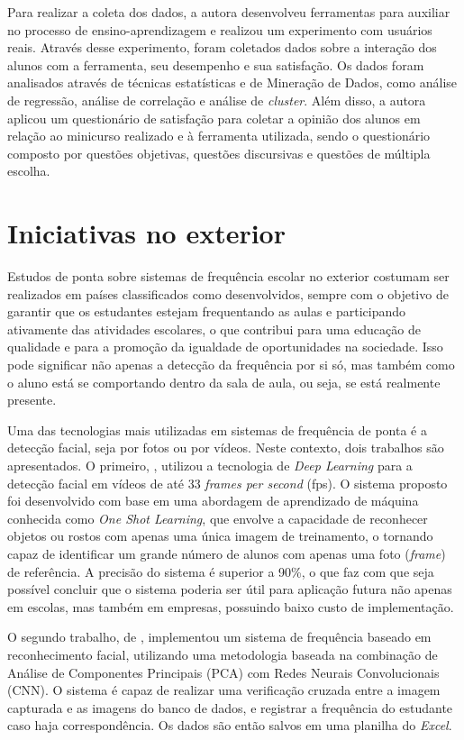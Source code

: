 Para realizar a coleta dos dados, a autora desenvolveu ferramentas para auxiliar no processo de ensino-aprendizagem e realizou um experimento com usuários reais. Através desse experimento, foram coletados dados sobre a interação dos alunos com a ferramenta, seu desempenho e sua satisfação. Os dados foram analisados através de técnicas estatísticas e de Mineração de Dados, como análise de regressão, análise de correlação e análise de \textit{cluster}. Além disso, a autora aplicou um questionário de satisfação para coletar a opinião dos alunos em relação ao minicurso realizado e à ferramenta utilizada, sendo o questionário composto por questões objetivas, questões discursivas e questões de múltipla escolha.

\section{Iniciativas no exterior}
\label{sec:exterior}

Estudos de ponta sobre sistemas de frequência escolar no exterior costumam ser realizados em países classificados como desenvolvidos, sempre com o objetivo de garantir que os estudantes estejam frequentando as aulas e participando ativamente das atividades escolares, o que contribui para uma educação de qualidade e para a promoção da igualdade de oportunidades na sociedade. Isso pode significar não apenas a detecção da frequência por si só, mas também como o aluno está se comportando dentro da sala de aula, ou seja, se está realmente presente.

Uma das tecnologias mais utilizadas em sistemas de frequência de ponta é a detecção facial, seja por fotos ou por vídeos. Neste contexto, dois trabalhos são apresentados. O primeiro, \cite{bhat:2020}, utilizou a tecnologia de \textit{Deep Learning} para a detecção facial em vídeos de até 33 \textit{frames per second} (fps). O sistema proposto foi desenvolvido com base em uma abordagem de aprendizado de máquina conhecida como \textit{One Shot Learning}, que envolve a capacidade de reconhecer objetos ou rostos com apenas uma única imagem de treinamento, o tornando capaz de identificar um grande número de alunos com apenas uma foto (\textit{frame}) de referência. A precisão do sistema é superior a 90\%, o que faz com que seja possível concluir que o sistema poderia ser útil para aplicação futura não apenas em escolas, mas também em empresas, possuindo baixo custo de implementação.

O segundo trabalho, de , implementou um sistema de frequência baseado em reconhecimento facial, utilizando uma metodologia baseada na combinação de Análise de Componentes Principais (PCA) com Redes Neurais Convolucionais (CNN). O sistema é capaz de realizar uma verificação cruzada entre a imagem capturada e as imagens do banco de dados, e registrar a frequência do estudante caso haja correspondência. Os dados são então salvos em uma planilha do \textit{Excel}.

